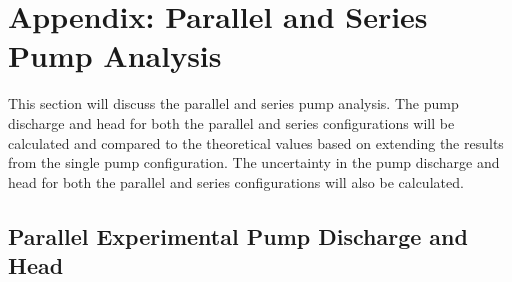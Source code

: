 \section{Appendix: Parallel and Series Pump Analysis}
\label{sec:parallel_and_series_pump_analysis}

This section will discuss the parallel and series pump analysis. The pump discharge and head for both the parallel and series configurations will be calculated and compared to the theoretical values based on extending the results from the single pump configuration. The uncertainty in the pump discharge and head for both the parallel and series configurations will also be calculated.

\subsection{Parallel Experimental Pump Discharge and Head}
\begin{table}[h]
    \centering
    \caption{Summary of experimental parallel pump discharge and heads for 2700 RPM}
    \label{tab:parallel_pump_discharge_head}
\end{table}
